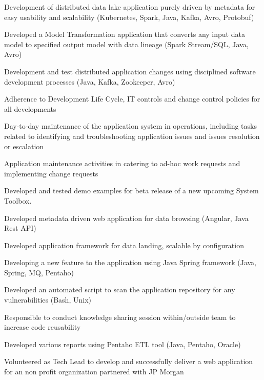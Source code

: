 \documentclass[]{main}
\begin{document}
\begin{minipage}[t]{0.73\textwidth}
\begin{tightemize}
\item Development of distributed data lake application purely driven by metadata for easy usability and scalability (Kubernetes, Spark, Java, Kafka, Avro, Protobuf)
\item Developed a Model Transformation application that converts any input data model to specified output model with data lineage (Spark Stream/SQL, Java, Avro) 
\item Development and test distributed application changes using disciplined software development processes (Java, Kafka, Zookeeper, Avro)
\item Adherence to Development Life Cycle, IT controls and change control policies for all developments
\item Day-to-day maintenance of the application system in operations, including tasks related to identifying and troubleshooting application issues and issues resolution or escalation
\item Application maintenance activities in catering to ad-hoc work requests and implementing change requests
\end{tightemize}
\sectionsep

\begin{tightemize}
\item Developed and tested demo examples for beta release of a new upcoming System Toolbox. 
\item Developed metadata driven web application for data browsing (Angular, Java Rest API)
\item Developed application framework for data landing, scalable by configuration
\item Developing a new feature to the application using Java Spring framework (Java, Spring, MQ, Pentaho)
\item Developed an automated script to scan the application repository for any vulnerabilities (Bash, Unix)
\item Responsible to conduct knowledge sharing session within/outside team to increase code reusability
\item Developed various reports using Pentaho ETL tool (Java, Pentaho, Oracle)
\item Volunteered as Tech Lead to develop and successfully deliver a web application for an non profit organization
partnered with JP Morgan
\end{tightemize}
\sectionsep


\end{minipage}
\end{document}
